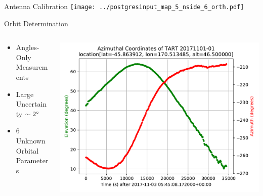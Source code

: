 \documentclass[ignorenonframetext]{beamer}
\begin{document}
\begin{frame}{Antenna Calibration}
\texttt{[image: ../postgresinput\_map\_5\_nside\_6\_orth.pdf]}
\end{frame}


\begin{frame}{Orbit Determination}
\begin{columns}
\begin{column}{0.4\linewidth}
   \begin{itemize}
    \item Angles-Only Measurements
    \item Large Uncertainty $\sim 2 \degree$
    \item 6 Unknown Orbital Parameters
   \end{itemize}
\end{column}
\begin{column}{0.6\linewidth}
 \includegraphics[width=\linewidth]{fig/el_plot.pdf}
\end{column}
\end{columns}
 
\end{frame}
\end{document}
